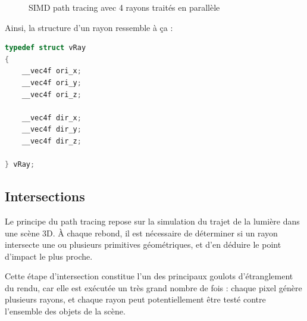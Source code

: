 \begin{figure}[H]
\centering
{}
\caption{SIMD path tracing avec 4 rayons traités en parallèle}
\end{figure}

\FloatBarrier

Ainsi, la structure d'un rayon ressemble à ça :

\begin{lstlisting}[language=C]
typedef struct vRay
{
    __vec4f ori_x;
    __vec4f ori_y;
    __vec4f ori_z;

    __vec4f dir_x;
    __vec4f dir_y;
    __vec4f dir_z;

} vRay;
\end{lstlisting}

\subsection{Intersections}

Le principe du path tracing repose sur la simulation du trajet de la lumière dans une scène 3D. À chaque rebond, il est nécessaire de déterminer si un rayon intersecte une ou plusieurs primitives géométriques, et d'en déduire le point d'impact le plus proche.

Cette étape d'intersection constitue l'un des principaux goulots d'étranglement du rendu, car elle est exécutée un très grand nombre de fois : chaque pixel génère plusieurs rayons, et chaque rayon peut potentiellement être testé contre l'ensemble des objets de la scène.

